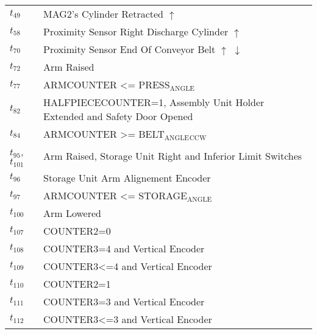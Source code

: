 \begin{longtable}{M{5cm}M{10cm}}
\hyperlink{completeNet:t49}{\hypertarget{completeTable:t49}{$t_{49}$}} & MAG2's Cylinder Retracted \(\uparrow\)\\
\hyperlink{completeNet:t58}{\hypertarget{completeTable:t58}{$t_{58}$}} & Proximity Sensor Right Discharge Cylinder \(\uparrow\)\\
\hyperlink{completeNet:t70}{\hypertarget{completeTable:t70}{$t_{70}$}} & Proximity Sensor End Of Conveyor Belt \(\uparrow\) \(\downarrow\)\\
\hyperlink{completeNet:t72}{\hypertarget{completeTable:t72}{$t_{72}$}} & Arm Raised\\
\hyperlink{completeNet:t77}{\hypertarget{completeTable:t77}{$t_{77}$}} & ARMCOUNTER <= PRESS\(_{\text{ANGLE}}\)\\
\hyperlink{completeNet:t82}{\hypertarget{completeTable:t82}{$t_{82}$}} & HALFPIECECOUNTER=1, Assembly Unit Holder Extended and Safety Door Opened\\
\hyperlink{completeNet:t84}{\hypertarget{completeTable:t84}{$t_{84}$}} & ARMCOUNTER >= BELT\(_{\text{ANGLE}}\)\(_{\text{CCW}}\)\\
\hyperlink{completeNet:t95}{\hypertarget{completeTable:t95}{$t_{95}$}}, \hyperlink{completeNet:t101}{\hypertarget{completeTable:t101}{$t_{101}$}} & Arm Raised, Storage Unit Right and Inferior Limit Switches\\
\hyperlink{completeNet:t96}{\hypertarget{completeTable:t96}{$t_{96}$}} & Storage Unit Arm Alignement Encoder\\
\hyperlink{completeNet:t97}{\hypertarget{completeTable:t97}{$t_{97}$}} & ARMCOUNTER <= STORAGE\(_{\text{ANGLE}}\)\\
\hyperlink{completeNet:t100}{\hypertarget{completeTable:t100}{$t_{100}$}} & Arm Lowered\\
\hyperlink{completeNet:t107}{\hypertarget{completeTable:t107}{$t_{107}$}} & COUNTER2=0\\
\hyperlink{completeNet:t108}{\hypertarget{completeTable:t108}{$t_{108}$}} & COUNTER3=4 and Vertical Encoder\\
\hyperlink{completeNet:t109}{\hypertarget{completeTable:t109}{$t_{109}$}} & COUNTER3<=4 and Vertical Encoder\\
\hyperlink{completeNet:t110}{\hypertarget{completeTable:t110}{$t_{110}$}} & COUNTER2=1\\
\hyperlink{completeNet:t111}{\hypertarget{completeTable:t111}{$t_{111}$}} & COUNTER3=3 and Vertical Encoder\\
\hyperlink{completeNet:t112}{\hypertarget{completeTable:t112}{$t_{112}$}} & COUNTER3<=3 and Vertical Encoder\\

\end{longtable}
